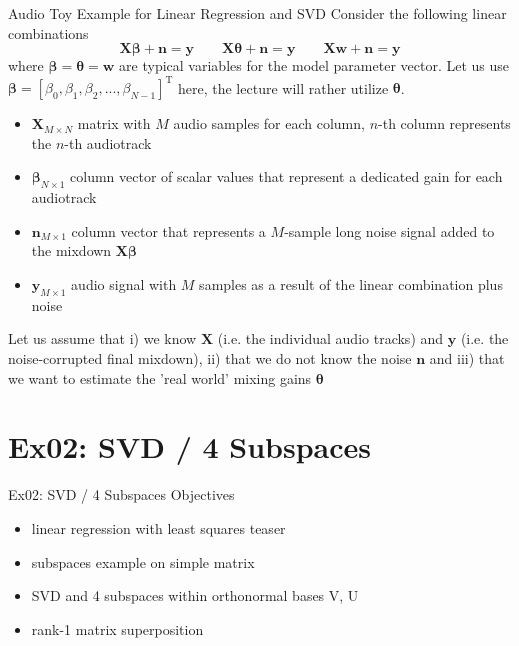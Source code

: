 \documentclass[mathserif, aspectratio=43]{intbeamer}
\begin{document}
\begin{frame}{Audio Toy Example for Linear Regression and SVD}
Consider the following linear combinations
$$\bm{X} \bm{\beta} + \bm{n} = \bm{y}\qquad
\bm{X} \bm{\theta} + \bm{n} = \bm{y}\qquad
\bm{X} \bm{w} + \bm{n} = \bm{y}$$
where $\bm{\beta}=\bm{\theta} = \bm{w}$ are typical variables for the model parameter vector. Let us use $\bm{\beta}=[\beta_0, \beta_1, \beta_2, ..., \beta_{N-1}]^\mathrm{T}$ here, the lecture will rather utilize $\bm{\theta}$.
%
\begin{itemize}
\item $\bm{X}_{M \times N}$ matrix with $M$ audio samples for each column, $n$-th column represents the $n$-th audiotrack
\item $\bm{\beta}_{N \times 1}$ column vector of scalar values that represent a dedicated gain for each audiotrack
\item $\bm{n}_{M \times 1}$ column vector that represents a $M$-sample long noise signal added to the mixdown $\bm{X} \bm{\beta}$
\item $\bm{y}_{M \times 1}$ audio signal with $M$ samples as a result of the linear combination plus noise
\end{itemize}
%
Let us assume that i) we know $\bm{X}$ (i.e. the individual audio tracks) and $\bm{y}$ (i.e. the noise-corrupted final mixdown), ii) that we do not know the noise $\bm{n}$ and iii) that we want to estimate the 'real world' mixing gains $\bm{\theta}$
\end{frame}


\section{Ex02: SVD / 4 Subspaces}
\begin{frame}{Ex02: SVD / 4 Subspaces}
Objectives
\begin{itemize}
\item linear regression with least squares teaser
\item subspaces example on simple matrix
\item SVD and 4 subspaces within orthonormal bases V, U
\item rank-1 matrix superposition
\end{itemize}
\end{frame}
\end{document}
